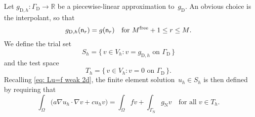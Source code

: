 Let $g_{\mathrm{D},h}:\Gamma_{\mathrm{D}}\to\mathbb{R}$ be a piecewise-linear 
approximation to~$g_{\mathrm{D}}$.  An obvious choice is the interpolant, so
that
\[
g_{\mathrm{D},h}(\mathsf{n}_r)=g(\mathsf{n}_r)
    \quad\text{for $M^{\mathrm{free}}+1\le r\le M$.}
\]
We define the trial set
\[
S_h=\{\,v\in V_h:\text{$v=g_{\mathrm{D},h}$ on $\Gamma_{\mathrm{D}}$}\,\}
\]
and the test space
\[
T_h=\{\,v\in V_h:\text{$v=0$ on $\Gamma_{\mathrm{D}}$}\,\}.
\]
Recalling \eqref{eq: Lu=f weak 2d}, the finite element 
solution~$u_h\in S_h$ is then defined by requiring that
\begin{equation}\label{eq: FEM 2d}
\int_\Omega\bigl(a\nabla u_h\cdot\nabla v+cu_hv\bigr)=\int_\Omega fv
	+\int_{\Gamma_{\mathrm{N}}}g_{\mathrm{N}}v
	\quad\text{for all $v\in T_h$.}
\end{equation}

